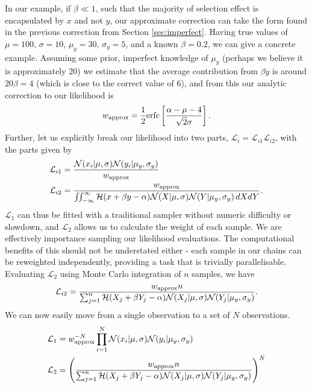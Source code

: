 \documentclass[a4paper,fleqn,usenatbib]{mnras}
\begin{document}
In our example, if $\beta \ll 1$, such that the majority of selection effect is encapsulated by $x$ and not $y$, our approximate correction can take the form found in the previous correction from Section \ref{sec:imperfect}. Having true values of $\mu = 100$, $\sigma = 10$, $\mu_y = 30$, $\sigma_y = 5$, and a known $\beta = 0.2$, we can give a concrete example. Assuming some prior, imperfect knowledge of $\mu_y$ (perhaps we believe it is approximately $20$) we estimate that the average contribution from $\beta y$ is around $20\beta = 4$ (which is close to the correct value of $6$), and from this our analytic correction to our likelihood is
\begin{align}
w_{\rm approx} = \frac{1}{2} {\rm erfc}\left[ \frac{\alpha - \mu - 4}{\sqrt{2}\sigma} \right].
\end{align}
Further, let us explicitly break our likelihood into two parts, $\mathcal{L}_i = \mathcal{L}_{i1} \mathcal{L}_{i2}$, with the parts given by
\begin{align}
\mathcal{L}_{i1} &= \frac{ \mathcal{N}(x_i|\mu, \sigma) \mathcal{N}(y_i|\mu_y, \sigma_y)}{w_{\rm approx} } \\
\mathcal{L}_{i2} &= \frac{ w_{\rm approx}  }{\iint_{-\infty}^\infty \mathcal{H}(x + \beta y - \alpha) \mathcal{N}(X|\mu, \sigma) \mathcal{N}(Y|\mu_y, \sigma_y)\, dX dY}.
\end{align}
$\mathcal{L}_1$ can thus be fitted with a traditional sampler without numeric difficulty or slowdown, and $\mathcal{L}_2$ allows us to calculate the weight of each sample. We are effectively importance sampling our likelihood evaluations. The computational benefits of this should not be understated either - each sample in our chains can be reweighted independently, providing a task that is trivially parallelisable. Evaluating $\mathcal{L}_2$ using Monte Carlo integration of $n$ samples, we have
\begin{align}
\mathcal{L}_{i2} = \frac{ w_{\rm approx}  n }{\sum_{j=1}^{n} \mathcal{H}(X_j + \beta Y_j - \alpha) \mathcal{N}(X_j|\mu, \sigma) \mathcal{N}(Y_j|\mu_y, \sigma_y)} \label{eq:mc}.
\end{align}
We can now easily move from a single observation to a set of $N$ observations.
\begin{align}
\mathcal{L}_1 &= w_{\rm approx}^{-N} \prod_{i=1}^N \mathcal{N}(x_i|\mu, \sigma) \mathcal{N}(y_i|\mu_y, \sigma_y) \\
\mathcal{L}_{2} &= \left(  \frac{ w_{\rm approx}  n }{\sum_{j=1}^{n} \mathcal{H}(X_j + \beta Y_j - \alpha) \mathcal{N}(X_j|\mu, \sigma) \mathcal{N}(Y_j|\mu_y, \sigma_y)}\right)^N
\end{align}
\end{document}
